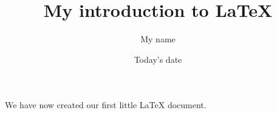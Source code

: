 \documentclass[11pt, a4paper]{article}
\title{My introduction to LaTeX}
\author{My name}
\date{Today's date}
\begin{document}
\maketitle %

We have now created our first little LaTeX document.
\end{document}
